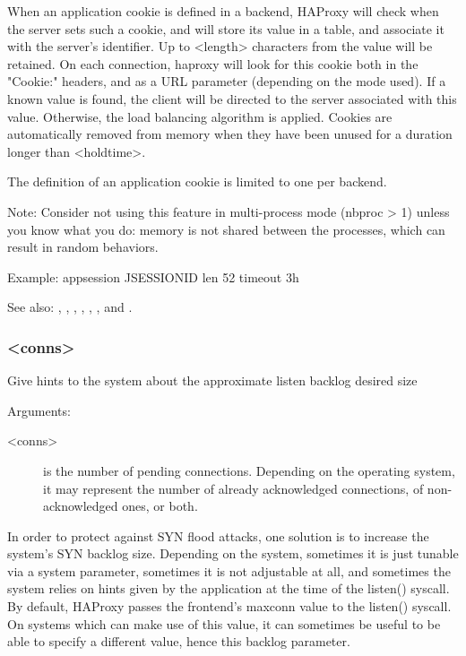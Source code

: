   When an application cookie is defined in a backend, HAProxy will check when
  the server sets such a cookie, and will store its value in a table, and
  associate it with the server's identifier. Up to <length> characters from
  the value will be retained. On each connection, haproxy will look for this
  cookie both in the "Cookie:" headers, and as a URL parameter (depending on
  the mode used). If a known value is found, the client will be directed to the
  server associated with this value. Otherwise, the load balancing algorithm is
  applied. Cookies are automatically removed from memory when they have been
  unused for a duration longer than <holdtime>.

  The definition of an application cookie is limited to one per backend.

  \begin{note}{Note:}
         Consider not using this feature in multi-process mode (nbproc > 1)
         unless you know what you do: memory is not shared between the
         processes, which can result in random behaviors.
  \end{note}
  
  \begin{example}{Example:}
  appsession JSESSIONID len 52 timeout 3h
  \end{example}

  See also: , , , ,
  , ,  and .

\subsubsection[backlog]{ <conns>}

  Give hints to the system about the approximate listen backlog desired size
 
  
  Arguments:
  \begin{description}
  \item[<conns>]
         is the number of pending connections. Depending on the operating
              system, it may represent the number of already acknowledged
              connections, of non-acknowledged ones, or both.
  \end{description}

  In order to protect against SYN flood attacks, one solution is to increase
  the system's SYN backlog size. Depending on the system, sometimes it is just
  tunable via a system parameter, sometimes it is not adjustable at all, and
  sometimes the system relies on hints given by the application at the time of
  the listen() syscall. By default, HAProxy passes the frontend's maxconn value
  to the listen() syscall. On systems which can make use of this value, it can
  sometimes be useful to be able to specify a different value, hence this
  backlog parameter.

